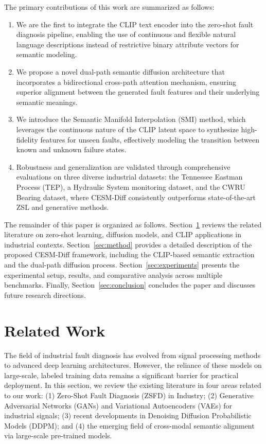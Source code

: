 \documentclass[journal]{IEEEtran}
\begin{document}
The primary contributions of this work are summarized as follows:
\begin{enumerate}
    \item We are the first to integrate the CLIP text encoder into the zero-shot fault diagnosis pipeline, enabling the use of continuous and flexible natural language descriptions instead of restrictive binary attribute vectors for semantic modeling.
    \item We propose a novel dual-path semantic diffusion architecture that incorporates a bidirectional cross-path attention mechanism, ensuring superior alignment between the generated fault features and their underlying semantic meanings.
    \item We introduce the Semantic Manifold Interpolation (SMI) method, which leverages the continuous nature of the CLIP latent space to synthesize high-fidelity features for unseen faults, effectively modeling the transition between known and unknown failure states.
    \item Robustness and generalization are validated through comprehensive evaluations on three diverse industrial datasets: the Tennessee Eastman Process (TEP), a Hydraulic System monitoring dataset, and the CWRU Bearing dataset, where CESM-Diff consistently outperforms state-of-the-art ZSL and generative methods.
\end{enumerate}

The remainder of this paper is organized as follows. Section~\ref{sec:related} reviews the related literature on zero-shot learning, diffusion models, and CLIP applications in industrial contexts. Section~\ref{sec:method} provides a detailed description of the proposed CESM-Diff framework, including the CLIP-based semantic extraction and the dual-path diffusion process. Section~\ref{sec:experiments} presents the experimental setup, results, and comparative analysis across multiple benchmarks. Finally, Section~\ref{sec:conclusion} concludes the paper and discusses future research directions.

\section{Related Work}
\label{sec:related}

The field of industrial fault diagnosis has evolved from signal processing methods to advanced deep learning architectures. However, the reliance of these models on large-scale, labeled training data remains a significant barrier for practical deployment. In this section, we review the existing literature in four areas related to our work: (1) Zero-Shot Fault Diagnosis (ZSFD) in Industry; (2) Generative Adversarial Networks (GANs) and Variational Autoencoders (VAEs) for industrial signals; (3) recent developments in Denoising Diffusion Probabilistic Models (DDPM); and (4) the emerging field of cross-modal semantic alignment via large-scale pre-trained models.
\end{document}

